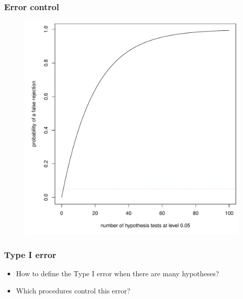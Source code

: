 \documentclass[xcolor={dvipsnames}]{beamer}
\begin{document}
\begin{frame}
\frametitle{Error control}
\begin{figure}
    \centering
\includegraphics[width = .6\textwidth]{plaatjes/typeI}
\end{figure}
\end{frame}


\begin{frame}
\frametitle{Type I error}
\begin{itemize}
    \item How to define the Type I error when there are many hypotheses?
    \bigskip
    \item Which procedures control this error?
\end{itemize}
\end{frame}
\end{document}

